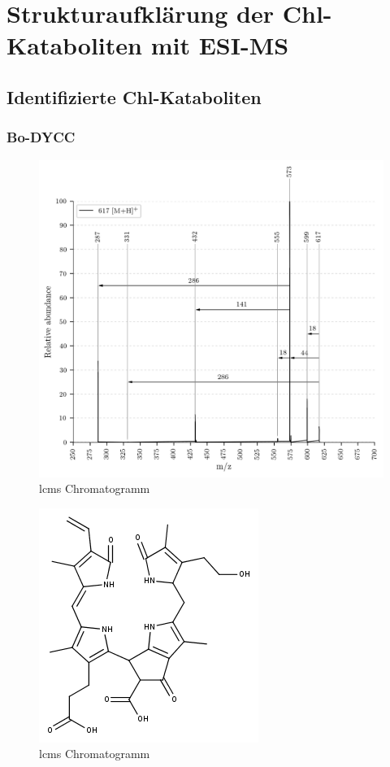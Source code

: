 \chapter{Strukturaufklärung der Chl-Kataboliten mit ESI-MS}

\section{Identifizierte Chl-Kataboliten}

\subsection{Bo-DYCC}

\begin{figure}[!htbp]
  \centering
  \includegraphics[width=\textwidth, height=0.7\textwidth]{figures/Kapitel7/Kataboliten/VWA_MS_617.png}
  \caption[LC-MS Chromatogramm vor der Reaktion, Quelle: Author]{\gls{lcms} Chromatogramm}
  \label{fig:LCMSChromatogramm}
\end{figure}

\begin{figure}[!htbp]
  \centering
  \includegraphics[scale=0.6]{figures/Kapitel7/Kataboliten/fragmentation_structures/VWA_Katabolit_617.png}
  \caption[LC-MS Chromatogramm vor der Reaktion, Quelle: Author]{\gls{lcms} Chromatogramm}
  \label{fig:LCMSChromatogramm}
\end{figure}

